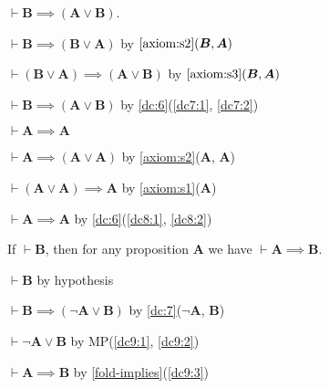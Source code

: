 \documentclass{amsart}%
\newcommand\metavariable[1]{\boldsymbol{#1}}
\begin{document}
\begin{dc}\label{dc:7}
$\vdash\metavariable{B}\implies(\metavariable{A}\lor\metavariable{B})$.
\end{dc}

\begin{pf}
\item\label{dc7:1} $\vdash\metavariable{B}\implies(\metavariable{B}\lor\metavariable{A})$
  by $\ref{axiom:s2}(\metavariable{B},\metavariable{A})$
\item\label{dc7:2} $\vdash(\metavariable{B}\lor\metavariable{A})\implies(\metavariable{A}\lor\metavariable{B})$
  by $\ref{axiom:s3}(\metavariable{B},\metavariable{A})$
\item $\vdash\metavariable{B}\implies(\metavariable{A}\lor\metavariable{B})$
  by \ref{dc:6}(\ref{dc7:1}, \ref{dc7:2})
\end{pf}

\begin{dc}\label{dc:8}
$\vdash\metavariable{A}\implies\metavariable{A}$
\end{dc}

\begin{pf}
\item\label{dc8:1} $\vdash\metavariable{A}\implies(\metavariable{A}\lor\metavariable{A})$
  by \ref{axiom:s2}($\metavariable{A}$, $\metavariable{A}$)
\item\label{dc8:2} $\vdash(\metavariable{A}\lor\metavariable{A})\implies\metavariable{A}$
  by \ref{axiom:s1}($\metavariable{A}$)
\item $\vdash\metavariable{A}\implies\metavariable{A}$ by
  \ref{dc:6}(\ref{dc8:1}, \ref{dc8:2})
\end{pf}

\begin{dc}\label{dc:9}
If $\vdash\metavariable{B}$, then for any proposition $\metavariable{A}$
we have $\vdash\metavariable{A}\implies\metavariable{B}$.
\end{dc}

\begin{pf}
\item\label{dc9:1} $\vdash\metavariable{B}$ by hypothesis
\item\label{dc9:2} $\vdash\metavariable{B}\implies(\neg\metavariable{A}\lor\metavariable{B})$
  by \ref{dc:7}($\neg{\metavariable{A}}$, $\metavariable{B}$)
\item\label{dc9:3} $\vdash\neg\metavariable{A}\lor\metavariable{B}$ by
  MP(\ref{dc9:1}, \ref{dc9:2})
\item $\vdash\metavariable{A}\implies\metavariable{B}$ by \ref{fold-implies}(\ref{dc9:3})
\end{pf}
\end{document}
